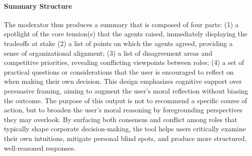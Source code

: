 \paragraph{Summary Structure}
The moderator thus produces a summary that is composed of four parts: (1) a spotlight of the core tension(s) that the agents raised, immediately displaying the tradeoffs at stake (2) a list of points on which the agents agreed, providing a sense of organizational alignment; (3) a list of disagreement areas and competitive priorities, revealing conflicting viewpoints between roles; (4) a set of practical questions or considerations that the user is encouraged to reflect on when making their own decision.
This design emphasizes cognitive support over persuasive framing, aiming to augment the user's moral reflection without biasing the outcome.
The purpose of this output is not to recommend a specific course of action, but to broaden the user's moral reasoning by foregrounding perspectives they may overlook. By surfacing both consensus and conflict among roles that typically shape corporate decision-making, the tool helps users critically examine their own intuitions, mitigate personal blind spots, and produce more structured, well-reasoned responses.
